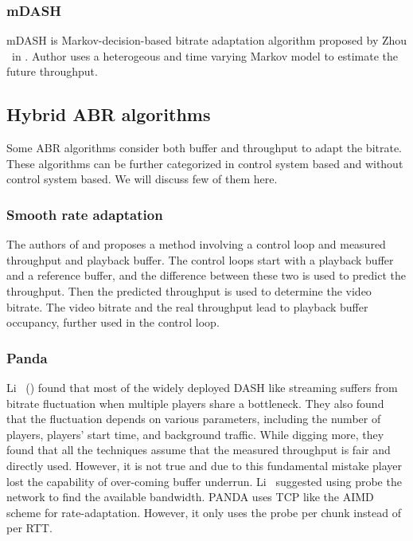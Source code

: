 \subsubsection{mDASH\cite{7393865}}
mDASH is Markov-decision-based bitrate adaptation algorithm proposed by Zhou \etal\ in \cite{7393865}. Author uses a heterogeous and time varying Markov model to estimate the future throughput.

\subsection{Hybrid ABR algorithms}
Some ABR algorithms consider both buffer and throughput to adapt the bitrate. These algorithms can be further categorized in control system based and without control system based. We will discuss few of them here.

\subsubsection{Smooth rate adaptation}
The authors of \cite{10.1145/2413176.2413190} and \cite{6694183} proposes a method involving a control loop and measured throughput and playback buffer. The control loops start with a playback buffer and a reference buffer, and the difference between these two is used to predict the throughput. Then the predicted throughput is used to determine the video bitrate. The video bitrate and the real throughput lead to playback buffer occupancy, further used in the control loop.

\subsubsection{Panda}
Li \etal\ (\cite{140405}) found that most of the widely deployed DASH like streaming suffers from bitrate fluctuation when multiple players share a bottleneck. They also found that the fluctuation depends on various parameters, including the number of players, players' start time, and background traffic. While digging more, they found that all the techniques assume that the measured throughput is fair and directly used. However, it is not true and due to this fundamental mistake player lost the capability of over-coming buffer underrun. Li \etal\ suggested using probe the network to find the available bandwidth. PANDA uses TCP like the AIMD scheme for rate-adaptation. However, it only uses the probe per chunk instead of per RTT.

